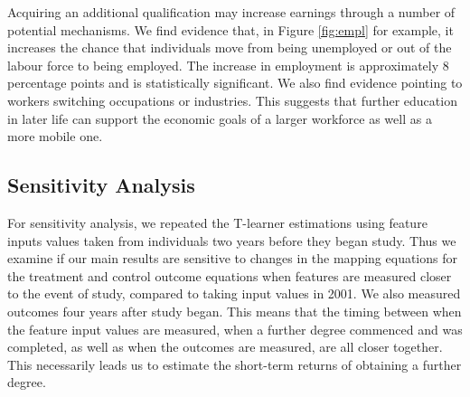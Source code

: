 \documentclass[12pt, a4paper]{article}
\begin{document}
%

Acquiring an additional qualification may increase earnings through a number of
potential mechanisms. We find evidence that, in Figure \ref{fig:empl} for
example, it increases the chance that individuals move from being unemployed or
out of the labour force to being employed. The increase in employment is
approximately 8 percentage points and is statistically significant. We also
find evidence pointing to workers switching occupations or industries. This
suggests that further education in later life can support the economic goals of
a larger workforce as well as a more mobile one.

\subsection{Sensitivity Analysis}

For sensitivity analysis, we repeated the T-learner estimations using feature inputs values taken from individuals two years before they began study. Thus we examine if our main results are sensitive to changes in the mapping equations for the treatment and control outcome equations when features are measured closer to the event of study, compared to taking input values in 2001. We also measured outcomes four years after study began. This means that the timing between when the feature input values are measured, when a further degree commenced and was completed, as well as when the outcomes are measured, are all closer together. This necessarily leads us to estimate the short-term returns of obtaining a further degree. 
\end{document}
